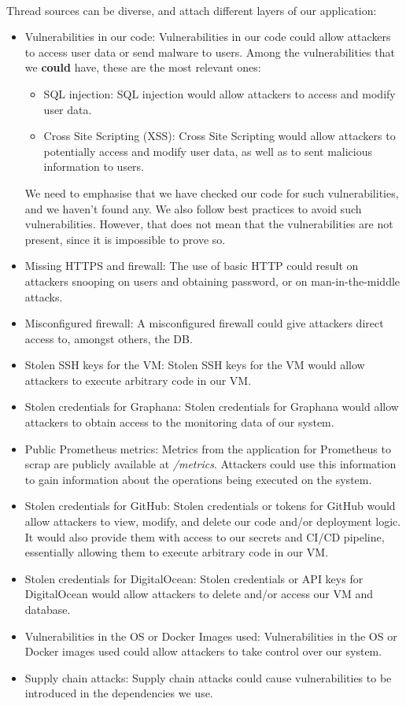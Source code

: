 \paragraph{} Thread sources can be diverse, and attach different layers of our application:
\begin{itemize}
	\item Vulnerabilities in our code: Vulnerabilities in our code could allow attackers to access user data or send malware to users. Among the vulnerabilities that we \textbf{could} have, these are the most relevant ones:
	\begin{itemize}
		\item SQL injection: SQL injection would allow attackers to access and modify user data.
		\item Cross Site Scripting (XSS): Cross Site Scripting would allow attackers to potentially access and modify user data, as well as to sent malicious information to users.
	\end{itemize}
	We need to emphasise that we have checked our code for such vulnerabilities, and we haven't found any. We also follow best practices to avoid such vulnerabilities. However, that does not mean that the vulnerabilities are not present, since it is impossible to prove so.
	\item Missing HTTPS and firewall: The use of basic HTTP could result on attackers snooping on users and obtaining password, or on man-in-the-middle attacks.
	\item Misconfigured firewall: A misconfigured firewall could give attackers direct access to, amongst others, the DB.
	\item Stolen SSH keys for the VM: Stolen SSH keys for the VM would allow attackers to execute arbitrary code in our VM.
	\item Stolen credentials for Graphana: Stolen credentials for Graphana would allow attackers to obtain access to the monitoring data of our system.
	\item Public Prometheus metrics: Metrics from the application for Prometheus to scrap are publicly available at \textit{/metrics}. Attackers could use this information to gain information about the operations being executed on the system.
	\item Stolen credentials for GitHub: Stolen credentials or tokens for GitHub would allow attackers to view, modify, and delete our code and/or deployment logic. It would also provide them with access to our secrets and CI/CD pipeline, essentially allowing them to execute arbitrary code in our VM.
	\item Stolen credentials for DigitalOcean: Stolen credentials or API keys for DigitalOcean would allow attackers to delete and/or access our VM and database.
	\item Vulnerabilities in the OS or Docker Images used: Vulnerabilities in the OS or Docker images used could allow attackers to take control over our system.
	\item Supply chain attacks: Supply chain attacks could cause vulnerabilities to be introduced in the dependencies we use.
\end{itemize}

